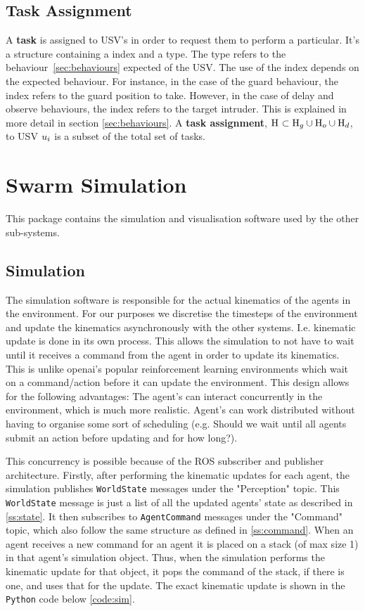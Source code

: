 \documentclass[bsc,frontabs,twoside,singlespacing,parskip,deptreport]{infthesis}     %
\begin{document}
\subsection{Task Assignment}
A \textbf{task} is assigned to USV's in order to request them to perform a particular. It's a structure containing a index and a type. The type refers to the behaviour~\ref{sec:behaviours} expected of the USV. The use of the index depends on the expected behaviour. For instance, in the case of the guard behaviour, the index refers to the guard position to take. However, in the case of delay and observe behaviours, the index refers to the target intruder. This is explained in more detail in section \ref{sec:behaviours}. A \textbf{task assignment}, $\mathrm{H}_{} \subset \mathrm{H}_{g} \cup \mathrm{H}_{o} \cup \mathrm{H}_{d}$, to USV $u_{i}$  is a subset of the total set of tasks.

\section{Swarm Simulation}
This package contains the simulation and visualisation software used by the other sub-systems.

\subsection{Simulation}
The simulation software is responsible for the actual kinematics of the agents in the environment. For our purposes we discretise the timesteps of the environment and update the kinematics asynchronously with the other systems. I.e. kinematic update is done in its own process. This allows the simulation to not have to wait until it receives a command from the agent in order to update its kinematics. This is unlike openai's popular reinforcement learning environments which wait on a command/action before it can update the environment. This design allows for the following advantages: The agent's can interact concurrently in the environment, which is much more realistic. Agent's can work distributed without having to organise some sort of scheduling (e.g. Should we wait until all agents submit an action before updating and for how long?). 

This concurrency is possible because of the ROS subscriber and publisher architecture. Firstly, after performing the kinematic updates for each agent, the simulation publishes \texttt{WorldState} messages under the "Perception" topic. This  \texttt{WorldState} message is just a list of all the updated agents' state as described in \ref{ss:state}. It then subscribes to \texttt{AgentCommand} messages under the "Command" topic, which also follow the same structure as defined in \ref{ss:command}. When an agent receives a new command for an agent it is placed on a stack (of max size 1) in that agent's simulation object. Thus, when the simulation performs the kinematic update for that object, it pops the command of the stack, if there is one, and uses that for the update. The exact kinematic update is shown in the \texttt{Python} code below \ref{code:sim}.
\end{document}
